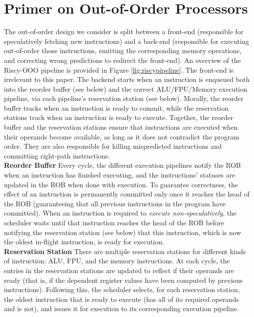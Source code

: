 \section{Primer on Out-of-Order Processors}
\label{apendixooo}


The out-of-order design we consider is split between a front-end (responsible for speculatively fetching new instructions) and a back-end (responsible for executing out-of-order those instructions, emitting the corresponding memory operations, and correcting wrong predictions to redirect the front-end).
An overview of the Riscy-OOO pipeline is provided in Figure \ref{fig:riscypipeline}.
The front-end is irrelevant to this paper. 
The backend starts when an instruction is enqueued both into the reorder buffer (see below) and the correct ALU/FPU/Memory execution pipeline, via each pipeline's reservation station (see below).
Morally, the reorder buffer tracks when an instruction is ready to commit, while the reservation stations track when an instruction is ready to execute.
Together, the reorder buffer and the reservation stations ensure that instructions are executed when their operands become available, as long as it does not contradict the program order. They are also responsible for killing mispredicted instructions and committing right-path instructions.
\\

\noindent\textbf{Reorder Buffer}
Every cycle, the different execution pipelines notify the ROB when an instruction has finished executing, and the instructions' statuses are updated in the ROB when done with execution.
To guarantee correctness, the effect of an instruction is permanently committed only once it reaches the head of the ROB (guaranteeing that all previous instructions in the program have committed).
When an instruction is required to \textit{execute non-speculatively}, the scheduler waits until that instruction reaches the head of the ROB before notifying the reservation station (see below) that this instruction, which is now the oldest in-flight instruction, is ready for execution. 
\\

\noindent\textbf{Reservation Station}
There are multiple reservation stations for different kinds of instruction: ALU, FPU, and the memory instructions.
At each cycle, the entries in the reservation stations are updated to reflect if their operands are ready (that is, if the dependent register values have been computed by previous instructions).
Following this, the scheduler selects, for each reservation station, the oldest instruction that is ready to execute (has all of its required operands and is not), and issues it for execution to its corresponding execution pipeline.

